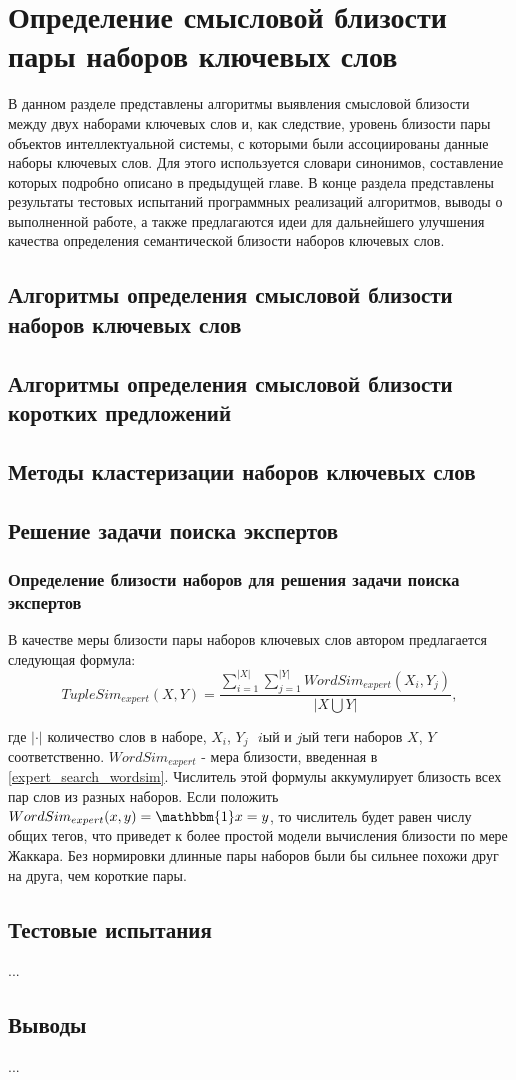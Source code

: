 \chapter{Определение смысловой близости пары наборов ключевых слов}
В данном разделе представлены алгоритмы выявления смысловой близости между двух наборами ключевых слов и, как следствие, уровень близости пары объектов интеллектуальной системы, с которыми были ассоциированы данные наборы ключевых слов.
Для этого используется словари синонимов, составление которых подробно описано в предыдущей главе.
В конце раздела представлены результаты тестовых испытаний программных реализаций алгоритмов, выводы о выполненной работе, а также предлагаются идеи для дальнейшего улучшения качества определения семантической близости наборов ключевых слов.

\section{Алгоритмы определения смысловой близости наборов ключевых слов}
\section{Алгоритмы определения смысловой близости коротких предложений}
\section{Методы кластеризации наборов ключевых слов}

\section{Решение задачи поиска экспертов} \label{expert_search_tuplesim}
\subsection{Определение близости наборов для решения задачи поиска экспертов}
В качестве меры близости пары наборов ключевых слов автором предлагается следующая формула:
$$ TupleSim_{expert}(X,Y) = \frac{\sum_{i=1}^{|X|}\sum_{j=1}^{|Y|}WordSim_{expert}(X_i, Y_j)}{|X \bigcup Y|}, $$

где $|\cdot|$ ­ количество слов в наборе, $X_i$, $Y_j$ ­ $i$­ый и $j$­ый теги наборов $X$, $Y$ соответственно. $WordSim_{expert}$ - мера близости, введенная в \ref{expert_search_wordsim}. Числитель этой формулы аккумулирует близость всех пар слов из разных наборов. Если положить $WordSim_{expert}(x, y) = \mathbbm{1}x=y$, то числитель будет равен числу общих тегов, что приведет к более простой модели вычисления близости по мере Жаккара. Без нормировки длинные пары наборов были бы сильнее похожи друг на друга, чем короткие пары.


\section{Тестовые испытания}
...
\section{Выводы}
...
